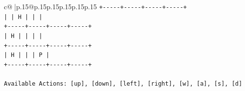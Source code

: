 \documentclass{article}
\begin{document}
{\begin{supertabular}{c@{$\;$}|p{.15\linewidth}@{}p{.15\linewidth}p{.15\linewidth}p{.15\linewidth}p{.15\linewidth}p{.15\linewidth}}
{{{\texttt{+{-}{-}{-}{-}{-}+{-}{-}{-}{-}{-}+{-}{-}{-}{-}{-}+{-}{-}{-}{-}{-}+} \\
\texttt{|     |  H  |     |     |} \\
\texttt{+{-}{-}{-}{-}{-}+{-}{-}{-}{-}{-}+{-}{-}{-}{-}{-}+{-}{-}{-}{-}{-}+} \\
\texttt{|  H  |     |     |     |} \\
\texttt{+{-}{-}{-}{-}{-}+{-}{-}{-}{-}{-}+{-}{-}{-}{-}{-}+{-}{-}{-}{-}{-}+} \\
\texttt{|  H  |     |     |  P  |} \\
\texttt{+{-}{-}{-}{-}{-}+{-}{-}{-}{-}{-}+{-}{-}{-}{-}{-}+{-}{-}{-}{-}{-}+} \\
\\ 
\texttt{Available Actions: {[}up{]}, {[}down{]}, {[}left{]}, {[}right{]}, {[}w{]}, {[}a{]}, {[}s{]}, {[}d{]}} \\
            }
        }
    }
     \\ \\


\end{supertabular}}
\end{document}
